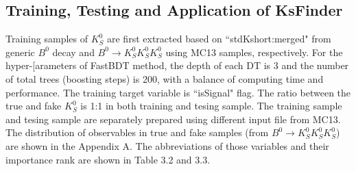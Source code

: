  \subsection{Training, Testing and Application of KsFinder}
 Training samples of $K_S^0$ are first extracted based on ``stdKshort:merged" from generic $B^0$ decay and $B^0 \to K_S^0  K_S^0  K_S^0$ using MC13 samples, respectively. For the hyper-[arameters of FastBDT method, the depth of each DT is 3 and the number of total trees (boosting steps) is 200, with a balance of computing time and performance. The training target variable is ``isSignal" flag. The ratio between the true and fake $K_S^0$ is 1:1 in both training and tesing sample. The training sample and tesing sample are separately prepared using different input file from MC13. The distribution of observables in true and fake samples (from $B^0 \to K_S^0  K_S^0  K_S^0$) are shown in the Appendix A. The abbreviations of those variables and their importance rank are shown in Table 3.2 and 3.3. 
 
